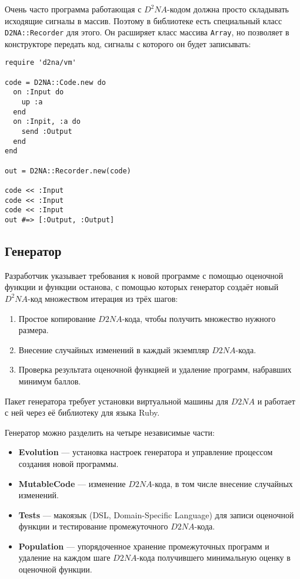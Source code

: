 \documentclass[utf8,a5paper,portrait,12pt]{eskdtext}
\begin{document}
Очень часто программа работающая с $D^2NA$-кодом должна просто складывать
исходящие сигналы в массив. Поэтому в библиотеке есть специальный класс
\texttt{D2NA::Recorder} для этого. Он расширяет класс массива \texttt{Array},
но позволяет в конструкторе передать код, сигналы с которого он будет
записывать:
\begin{verbatim}
require 'd2na/vm'

code = D2NA::Code.new do
  on :Input do
    up :a
  end
  on :Inpit, :a do
    send :Output
  end
end

out = D2NA::Recorder.new(code)

code << :Input
code << :Input
code << :Input
out #=> [:Output, :Output]
\end{verbatim}

\subsection{Генератор}
Разработчик указывает требования к новой программе с помощью оценочной функции и
функции останова, с помощью которых генератор создаёт новый $D^2NA$-код
множеством итерация из трёх шагов:
\begin{enumerate}
  \item Простое копирование $D2NA$-кода, чтобы получить множество нужного
        размера.
  \item Внесение случайных изменений в каждый экземпляр $D2NA$-кода.
  \item Проверка результата оценочной функцией и удаление программ, набравших
        минимум баллов.
\end{enumerate}

Пакет генератора требует установки виртуальной машины для $D2NA$ и работает с
ней через её библиотеку для языка Ruby.

Генератор можно разделить на четыре независимые части:
\begin{itemize}
  \item \textbf{Evolution} — установка настроек генератора и управление
        процессом создания новой программы.
  \item \textbf{MutableCode} — изменение $D2NA$-кода, в том числе внесение
        случайных изменений.
  \item \textbf{Tests} — макоязык (DSL, Domain-Specific Language) для записи
        оценочной функции и тестирование промежуточного $D2NA$-кода.
  \item \textbf{Population} — упорядоченное хранение промежуточных программ и
        удаление на каждом шаге $D2NA$-кода получившего минимальную оценку в
        оценочной функции.
\end{itemize}
\end{document}

